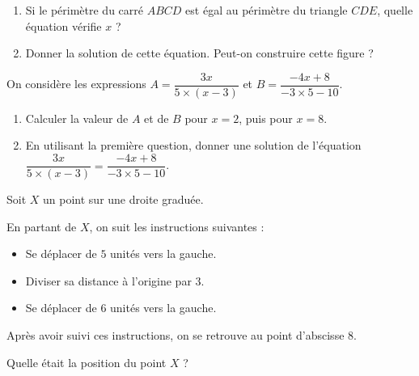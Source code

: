 \documentclass[
	classe=$2^{de}$,
	headerTitle=Évaluation\space Chapitre\space 1,
	surFeuille
]{évaluation}
\begin{document}
\begin{exercice}
	\begin{center}
	\end{center}

	\begin{enumerate}
		\item Si le périmètre du carré $ABCD$ est égal au périmètre du triangle $CDE$, quelle équation vérifie $x$ ? %
		\item Donner la solution de cette équation. %
		      Peut-on construire cette figure ? %
	\end{enumerate}
\end{exercice}

\begin{exercice}
	On considère les expressions $A = \dfrac{3x}{5 × (x - 3)}$ et $B = \dfrac{-4x + 8}{-3 × 5 - 10}$.
	\begin{enumerate}
		\item Calculer la valeur de $A$ et de $B$ pour $x = 2$, puis pour $x = 8$. %
		\item En utilisant la première question, donner une solution de l'équation $\dfrac{3x}{5 × (x - 3)} = \dfrac{-4x + 8}{-3 × 5 - 10}$.
	\end{enumerate}
\end{exercice}

\begin{exercice}
	Soit $X$ un point sur une droite graduée.

	En partant de $X$, on suit les instructions suivantes :
	\begin{itemize}
		\item Se déplacer de $5$ unités vers la gauche.
		\item Diviser sa distance à l'origine par $3$.
		\item Se déplacer de $6$ unités vers la gauche.
	\end{itemize}

	Après avoir suivi ces instructions, on se retrouve au point d'abscisse $8$.

	Quelle était la position du point $X$ ?
\end{exercice}
\end{document}
